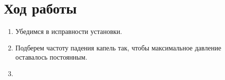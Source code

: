 \documentclass[12pt]{article}
\begin{document}
    \section{Ход работы}
    \begin{enumerate}
        \item Убедимся в исправности установки.
        \item Подберем частоту падения капель так, чтобы максимальное 
        давление оставалось постоянным.
        \item 
    \end{enumerate}
\end{document}
